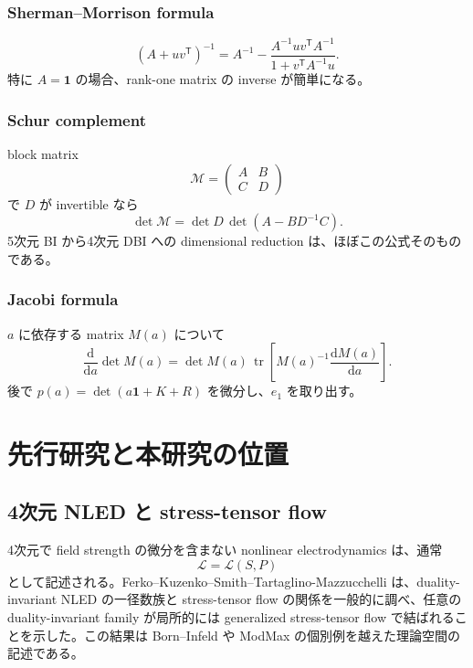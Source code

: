 \documentclass[a4paper,11pt]{ltjsreport}
\newcommand{\tr}{\operatorname{tr}}
\newcommand{\dd}{\mathrm{d}}
\newcommand{\Lag}{\mathcal L}
\newcommand{\Id}{\mathbf 1}
\begin{document}
\subsection{Sherman--Morrison formula}

\begin{equation}
 (A+uv^{\mathsf T})^{-1}
 =A^{-1}-\frac{A^{-1}uv^{\mathsf T}A^{-1}}
 {1+v^{\mathsf T}A^{-1}u}.
 \label{eq:SM}
\end{equation}
特に $A=\Id$ の場合、rank-one matrix の inverse が簡単になる。

\subsection{Schur complement}

block matrix
\begin{equation}
 \mathcal M=
 \begin{pmatrix}
 A&B\\ C&D
 \end{pmatrix}
\end{equation}
で $D$ が invertible なら
\begin{equation}
 \det\mathcal M
 =\det D\,\det(A-BD^{-1}C).
 \label{eq:Schur}
\end{equation}
5次元 BI から4次元 DBI への dimensional reduction は、ほぼこの公式そのものである。

\subsection{Jacobi formula}

$a$ に依存する matrix $M(a)$ について
\begin{equation}
 \frac{\dd}{\dd a}\det M(a)
 =\det M(a)\,\tr\left[M(a)^{-1}\frac{\dd M(a)}{\dd a}\right].
 \label{eq:Jacobi}
\end{equation}
後で $p(a)=\det(a\Id+K+R)$ を微分し、$e_1$ を取り出す。

\chapter{先行研究と本研究の位置}

\section{4次元 NLED と stress-tensor flow}

4次元で field strength の微分を含まない nonlinear electrodynamics は、通常
\begin{equation}
 \Lag=\Lag(S,P)
\end{equation}
として記述される。Ferko--Kuzenko--Smith--Tartaglino-Mazzucchelli は、duality-invariant NLED の一径数族と stress-tensor flow の関係を一般的に調べ、任意の duality-invariant family が局所的には generalized stress-tensor flow で結ばれることを示した\cite{Ferko2023a}。この結果は Born--Infeld や ModMax の個別例を越えた理論空間の記述である。
\end{document}

